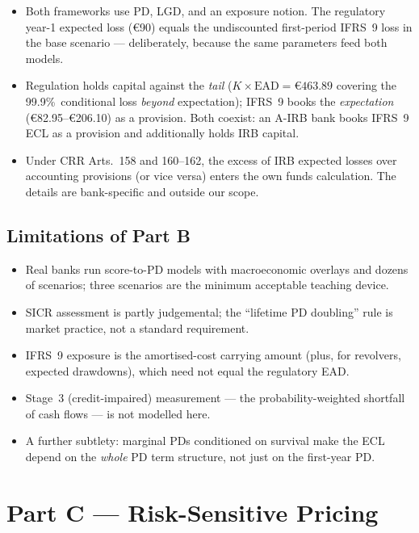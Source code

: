 \documentclass[11pt,a4paper]{report}
\renewcommand{\EUR}[1]{\euro#1}
\theoremstyle{definition}
\theoremstyle{plain}
\newcommand{\EAD}{\mathrm{EAD}}
\begin{document}
\begin{itemize}
\item Both frameworks use PD, LGD, and an exposure notion. The
      regulatory year-1 expected loss (\EUR{90}) equals the
      undiscounted first-period IFRS~9 loss in the base scenario ---
      deliberately, because the same parameters feed both models.
\item Regulation holds capital against the \emph{tail}
      ($K\times\EAD=\EUR{463.89}$ covering the 99.9\%\ conditional
      loss \emph{beyond} expectation); IFRS~9 books the
      \emph{expectation} (\EUR{82.95}--\EUR{206.10}) as a provision.
      Both coexist: an A-IRB bank books IFRS~9 ECL as a provision and
      additionally holds IRB capital.
\item Under CRR Arts.~158 and 160--162, the excess of IRB expected
      losses over accounting provisions (or vice versa) enters the
      own funds calculation. The details are bank-specific and outside
      our scope.
\end{itemize}

\section{Limitations of Part B}

\begin{itemize}
\item Real banks run score-to-PD models with macroeconomic overlays and
      dozens of scenarios; three scenarios are the minimum acceptable
      teaching device.
\item SICR assessment is partly judgemental; the ``lifetime PD doubling''
      rule is market practice, not a standard requirement.
\item IFRS~9 exposure is the amortised-cost carrying amount (plus, for
      revolvers, expected drawdowns), which need not equal the
      regulatory EAD.
\item Stage~3 (credit-impaired) measurement --- the probability-weighted
      shortfall of cash flows --- is not modelled here.
\item A further subtlety: marginal PDs conditioned on survival make the
      ECL depend on the \emph{whole} PD term structure, not just on the
      first-year PD.
\end{itemize}

\chapter{Part C --- Risk-Sensitive Pricing}
\label{chap:pricing}
\end{document}
